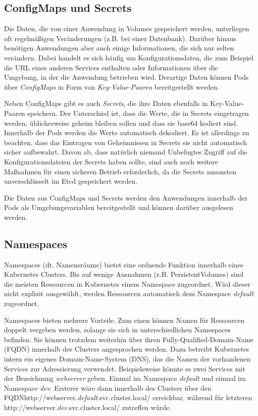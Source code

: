 \documentclass[11pt,a4paper]{article}
\begin{document}
\subsection{ConfigMaps und Secrets}
Die Daten, die von einer Anwendung in Volumes gespeichert werden, unterliegen oft regelmäßigen Veränderungen
(z.B. bei einer Datenbank). Darüber hinaus benötigen Anwendungen aber auch einige Informationen, die sich nur 
selten verändern. Dabei handelt es sich häufig um Konfigurationsdaten, die zum Beispiel die URL eines anderen
Services enthalten oder Informationen über die Umgebung, in der die Anwendung betrieben wird.
Derartige Daten können Pods über \emph{ConfigMaps} in Form von \emph{Key-Value-Paaren} bereitgestellt werden.

Neben ConfigMaps gibt es auch \emph{Secrets}, die ihre Daten ebenfalls in Key-Value-Paaren speichern.
Der Unterschied ist, dass die Werte, die in Secrets eingetragen werden, üblicherweise geheim bleiben sollen und
dass sie base64 kodiert sind. Innerhalb der Pods werden die Werte automatisch dekodiert.
Es ist allerdings zu beachten, dass das Eintragen von Geheimnissen in Secrets sie nicht automatisch sicher
aufbewahrt. Davon ab, dass natürlich niemand Unbefugtes Zugriff auf die Konfigurationsdateien der Secrets haben sollte,
sind auch noch weitere Maßnahmen für einen sicheren Betrieb erforderlich, da die Secrets ansonsten
unverschlüsselt im Etcd gespeichert werden.

Die Daten aus ConfigMaps und Secrets werden den Anwendungen innerhalb der Pods als Umgebungsvariablen
bereitgestellt und können darüber ausgelesen werden.

\subsection{Namespaces}
Namespaces (dt. Namensräume) bietet eine ordnende Funktion innerhalb eines Kubernetes Clusters.
Bis auf wenige Ausnahmen (z.B. PersistentVolumes) sind die meisten Ressourcen in Kubernetes einem 
Namespace zugeordnet. Wird dieser nicht explizit ausgewählt, werden Ressourcen automatisch dem 
Namespace \emph{default} zugeordnet.

Namespaces bieten mehrere Vorteile. Zum einen können Namen für Ressourcen doppelt vergeben werden,
solange sie sich in unterschiedlichen Namespaces befinden. Sie können trotzdem weiterhin
über ihren Fully-Qualified-Domain-Name (FQDN) innerhalb des Clusters angesprochen werden.
Dazu betreibt Kubernetes intern ein eigenes Domain-Name-System (DNS), das die Namen
der vorhandenen Services zur Adressierung verwendet.
Beispielsweise könnte es zwei Services mit der Bezeichnung \emph{webserver} geben.
Einmal im Namespace \emph{default} und einmal im Namespace \emph{dev}. 
Ersterer wäre dann innerhalb des Clusters über den FQDN\linebreak http://webserver.\emph{default}.svc.cluster.local/
erreichbar, während für letzteren http://webserver.\emph{dev}.svc.cluster.local/ zutreffen würde.
\end{document}
